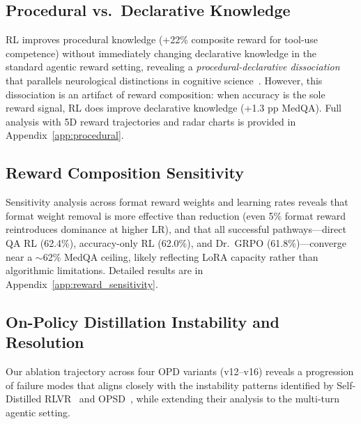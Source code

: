 \documentclass{article}
\begin{document}
\subsection{Procedural vs.\ Declarative Knowledge}
\label{sec:procedural}

RL improves procedural knowledge (+22\% composite reward for tool-use competence) without immediately changing declarative knowledge in the standard agentic reward setting, revealing a \emph{procedural-declarative dissociation} that parallels neurological distinctions in cognitive science~\citep{squire2004memory}. However, this dissociation is an artifact of reward composition: when accuracy is the sole reward signal, RL does improve declarative knowledge (+1.3 pp MedQA). Full analysis with 5D reward trajectories and radar charts is provided in Appendix~\ref{app:procedural}.

\subsection{Reward Composition Sensitivity}
\label{sec:reward_sensitivity}

Sensitivity analysis across format reward weights and learning rates reveals that format weight removal is more effective than reduction (even 5\% format reward reintroduces dominance at higher LR), and that all successful pathways---direct QA RL (62.4\%), accuracy-only RL (62.0\%), and Dr.~GRPO (61.8\%)---converge near a $\sim$62\% MedQA ceiling, likely reflecting LoRA capacity rather than algorithmic limitations. Detailed results are in Appendix~\ref{app:reward_sensitivity}.

\subsection{On-Policy Distillation Instability and Resolution}
\label{sec:opd_instability}

Our ablation trajectory across four OPD variants (v12--v16) reveals a progression of failure modes that aligns closely with the instability patterns identified by Self-Distilled RLVR~\citep{yang26rlsd} and OPSD~\citep{zhao26opsd}, while extending their analysis to the multi-turn agentic setting.
\end{document}
